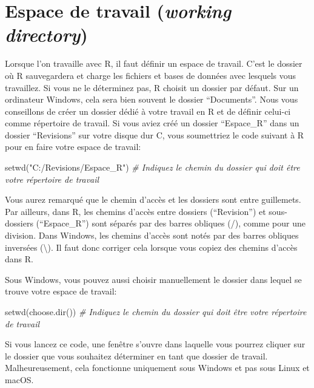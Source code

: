 \documentclass[
]{book}
\newenvironment{Shaded}{\begin{snugshade}}{\end{snugshade}}
\newcommand{\CommentTok}[1]{\textcolor[rgb]{0.56,0.35,0.01}{\textit{#1}}}
\newcommand{\FunctionTok}[1]{\textcolor[rgb]{0.00,0.00,0.00}{#1}}
\newcommand{\NormalTok}[1]{#1}
\newcommand{\StringTok}[1]{\textcolor[rgb]{0.31,0.60,0.02}{#1}}
\begin{document}
\hypertarget{working_directory}{%
\section{\texorpdfstring{Espace de travail (\emph{working directory})}{Espace de travail (working directory)}}\label{working_directory}}

Lorsque l'on travaille avec R, il faut définir un espace de travail. C'est le dossier où R sauvegardera et charge les fichiers et bases de données avec lesquels vous travaillez. Si vous ne le déterminez pas, R choisit un dossier par défaut. Sur un ordinateur Windows, cela sera bien souvent le dossier ``Documents''. Nous vous conseillons de créer un dossier dédié à votre travail en R et de définir celui-ci comme répertoire de travail. Si vous aviez créé un dossier ``Espace\_R'' dans un dossier ``Revisions'' sur votre disque dur C, vous soumettriez le code suivant à R pour en faire votre espace de travail:

\begin{Shaded}
\begin{Highlighting}[]
\FunctionTok{setwd}\NormalTok{(}\StringTok{"C:/Revisions/Espace\_R"}\NormalTok{) }\CommentTok{\# Indiquez le chemin du dossier qui doit être votre répertoire de travail}
\end{Highlighting}
\end{Shaded}

Vous aurez remarqué que le chemin d'accès et les dossiers sont entre guillemets. Par ailleurs, dans R, les chemins d'accès entre dossiers (``Revision'') et sous-dossiers (``Espace\_R'') sont séparés par des barres obliques (/), comme pour une division. Dans Windows, les chemins d'accès sont notés par des barres obliques inversées (\textbackslash). Il faut donc corriger cela lorsque vous copiez des chemins d'accès dans R.

Sous Windows, vous pouvez aussi choisir manuellement le dossier dans lequel se trouve votre espace de travail:

\begin{Shaded}
\begin{Highlighting}[]
\FunctionTok{setwd}\NormalTok{(}\FunctionTok{choose.dir}\NormalTok{()) }\CommentTok{\# Indiquez le chemin du dossier qui doit être votre répertoire de travail}
\end{Highlighting}
\end{Shaded}

Si vous lancez ce code, une fenêtre s'ouvre dans laquelle vous pourrez cliquer sur le dossier que vous souhaitez déterminer en tant que dossier de travail. Malheureusement, cela fonctionne uniquement sous Windows et pas sous Linux et macOS.
\end{document}
